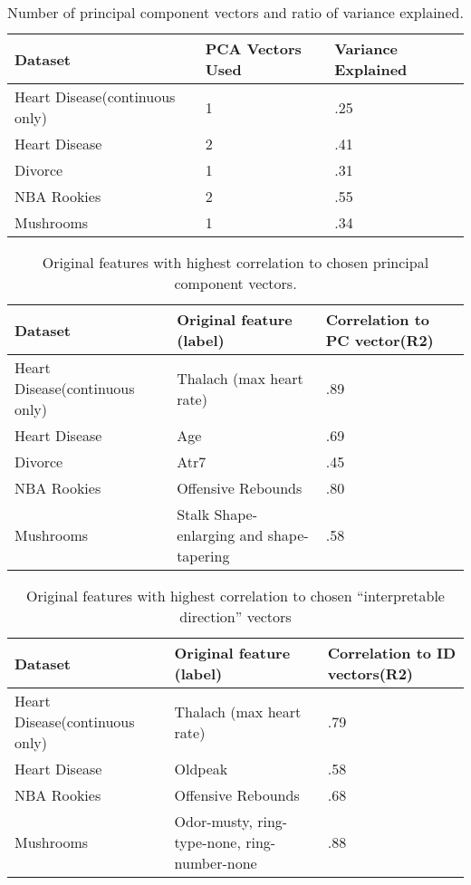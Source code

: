 \documentclass{article}
\begin{document}
{\begin{figure}
\end{figure}


\begin{table}
  \caption{Number of principal component vectors and ratio of variance explained.}
  \centering
  \begin{tabular}{lll}
    \toprule
    \midrule
    Dataset     & PCA Vectors Used       & Variance Explained \\
    \midrule
    \midrule
    Heart Disease(continuous only) & 1 & .25     \\
    \midrule
    Heart Disease & 2 & .41     \\
    \midrule
    Divorce     & 1 & .31    \\
    \midrule
    NBA Rookies     & 2   & .55 \\
    \midrule
    Mushrooms     & 1   & .34 \\
    \bottomrule
  \end{tabular}
\end{table}

\begin{table}
	\caption{ Original features with highest correlation to chosen principal component vectors.}
	\centering
	\begin{tabular}{lll}
    \toprule
	\midrule
	Dataset     & Original feature (label)     & Correlation to PC vector(R2) \\
	\midrule
	\midrule
	Heart Disease(continuous only) & Thalach (max heart rate) & .89     \\
	\midrule
	Heart Disease & Age & .69     \\
	\midrule
	Divorce     & Atr7  & .45    \\
	\midrule
	NBA Rookies     & Offensive Rebounds   & .80 \\
	\midrule
	Mushrooms     & Stalk Shape-enlarging and shape-tapering   & .58 \\
	\bottomrule
	\end{tabular}
\end{table}

\begin{table}
	\caption{Original features with highest correlation to chosen “interpretable direction” vectors }
	\centering
	\begin{tabular}{lll}
		\toprule
		\midrule
		Dataset     & Original feature (label)     & Correlation to ID vectors(R2) \\
		\midrule
		\midrule
		Heart Disease(continuous only) & Thalach (max heart rate) & .79     \\
		\midrule
		Heart Disease & Oldpeak & .58     \\
		\midrule
		NBA Rookies     & Offensive Rebounds   & .68 \\
		\midrule
		Mushrooms  & Odor-musty, ring-type-none, ring-number-none   & .88 \\
		\bottomrule
	\end{tabular}
\end{table}


}
\end{document}
